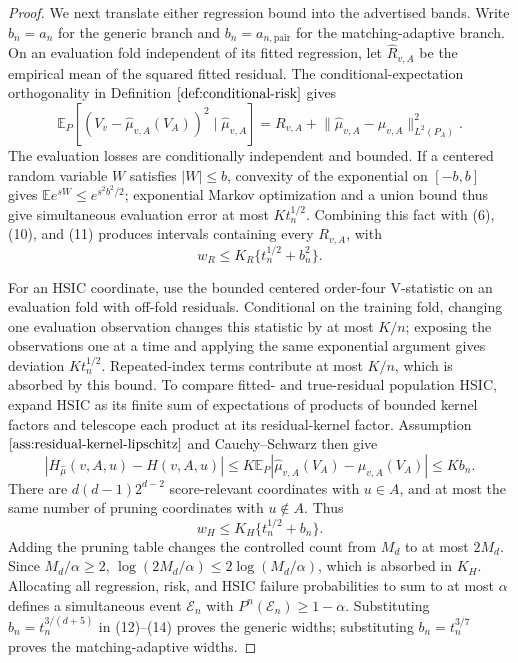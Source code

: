 \documentclass{article}
\begin{document}
\begin{proof}
We next translate either regression bound into the advertised bands. Write \(b_n=a_n\) for the generic branch and \(b_n=a_{n,\mathrm{pair}}\) for the matching-adaptive branch. On an evaluation fold independent of its fitted regression, let \(\widehat R_{v,A}\) be the empirical mean of the squared fitted residual. The conditional-expectation orthogonality in Definition \(\ref{def:conditional-risk}\) gives
\[
 \mathbb E_P\!\left[(V_v-\widehat\mu_{v,A}(V_A))^2\mid\widehat\mu_{v,A}\right]
 =R_{v,A}+\lVert\widehat\mu_{v,A}-\mu_{v,A}\rVert_{L^2(P_A)}^2. \tag{11}
\]
The evaluation losses are conditionally independent and bounded. If a centered random variable \(W\) satisfies \(|W|\le b\), convexity of the exponential on \([-b,b]\) gives \(\mathbb E e^{sW}\le e^{s^2b^2/2}\); exponential Markov optimization and a union bound thus give simultaneous evaluation error at most \(K t_n^{1/2}\). Combining this fact with (6), (10), and (11) produces intervals containing every \(R_{v,A}\), with
\[
 w_R\le K_R\{t_n^{1/2}+b_n^2\}. \tag{12}
\]

For an HSIC coordinate, use the bounded centered order-four V-statistic on an evaluation fold with off-fold residuals. Conditional on the training fold, changing one evaluation observation changes this statistic by at most \(K/n\); exposing the observations one at a time and applying the same exponential argument gives deviation \(K t_n^{1/2}\). Repeated-index terms contribute at most \(K/n\), which is absorbed by this bound. To compare fitted- and true-residual population HSIC, expand HSIC as its finite sum of expectations of products of bounded kernel factors and telescope each product at its residual-kernel factor. Assumption \(\ref{ass:residual-kernel-lipschitz}\) and Cauchy--Schwarz then give
\[
 \left|H_{\widehat\mu}(v,A,u)-H(v,A,u)\right|
 \le K\mathbb E_P
 \left|\widehat\mu_{v,A}(V_A)-\mu_{v,A}(V_A)\right|
 \le K b_n. \tag{13}
\]
There are \(d(d-1)2^{d-2}\) score-relevant coordinates with \(u\in A\), and at most the same number of pruning coordinates with \(u\notin A\). Thus
\[
 w_H\le K_H\{t_n^{1/2}+b_n\}. \tag{14}
\]
Adding the pruning table changes the controlled count from \(M_d\) to at most \(2M_d\). Since \(M_d/\alpha\ge2\), \(\log(2M_d/\alpha)\le2\log(M_d/\alpha)\), which is absorbed in \(K_H\). Allocating all regression, risk, and HSIC failure probabilities to sum to at most \(\alpha\) defines a simultaneous event \(\mathcal E_n\) with \(P^n(\mathcal E_n)\ge1-\alpha\). Substituting \(b_n=t_n^{3/(d+5)}\) in (12)--(14) proves the generic widths; substituting \(b_n=t_n^{3/7}\) proves the matching-adaptive widths.


\end{proof}
\end{document}
